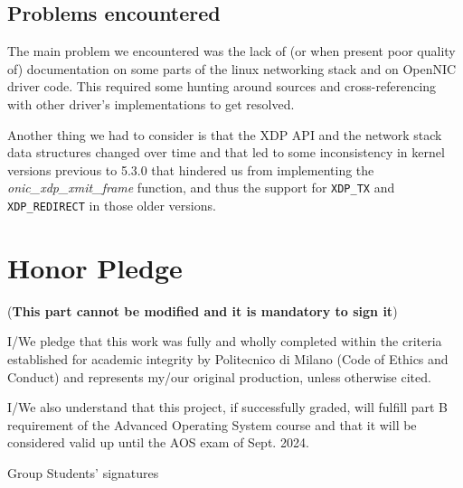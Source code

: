 \documentclass[10pt,a4]{article}
\begin{document}
\subsection{Problems encountered}
%

The main problem we encountered was the lack of (or when present
poor quality of) documentation on some parts of the linux networking stack and
on OpenNIC driver code. This required some hunting around sources and
cross-referencing with other driver's implementations to get resolved.

Another thing we had to consider is that the XDP API and the network stack data structures changed
over time and that led to some inconsistency in kernel versions previous to 5.3.0 that hindered us from
implementing the \textit{onic\_xdp\_xmit\_frame} function, and thus the support
for \texttt{XDP\_TX} and \texttt{XDP\_REDIRECT} in those older versions.

\section{Honor Pledge}
(\textbf{This part cannot be modified and it is mandatory to sign it})

I/We pledge that this work was fully and wholly completed within the criteria
established for academic integrity by Politecnico di Milano (Code of Ethics and
Conduct) and represents my/our original production, unless otherwise cited.

I/We also understand that this project, if successfully graded,  will fulfill part B requirement of the
Advanced Operating System course and that it will be considered valid up until
the AOS exam of Sept. 2024.

\begin{flushright}
Group Students' signatures
\end{flushright}
\end{document}
